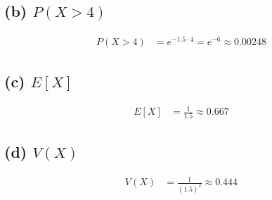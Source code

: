 \documentclass[12pt]{article}
\begin{document}
\subsection*{(b) $P(X > 4)$}
\begin{align*}
    P(X > 4) &= e^{-1.5 \cdot 4} = e^{-6} \approx 0.00248
\end{align*}

\subsection*{(c) $E[X]$}
\begin{align*}
    E[X] &= \frac{1}{1.5} \approx 0.667
\end{align*}

\subsection*{(d) $V(X)$}
\begin{align*}
    V(X) &= \frac{1}{(1.5)^2} \approx 0.444
\end{align*}
\end{document}
